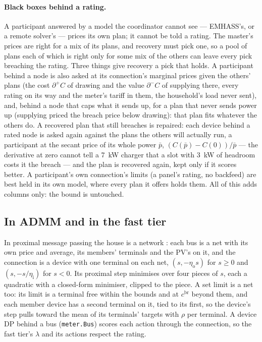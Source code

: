 \documentclass[11pt,a4paper]{article}
\newcommand{\cbr}{c^{\mathrm{br}}}
\begin{document}
\paragraph{Black boxes behind a rating.} A participant answered by a model the
coordinator cannot see --- EMHASS's, or a remote solver's --- prices its own
plan; it cannot be told a rating. The master's prices are right for a mix of
its plans, and recovery must pick one, so a pool of plans each of which is
right only for some mix of the others can leave every pick breaching the
rating. Three things give recovery a pick that holds. A participant behind a
node is also asked at its connection's marginal prices given the others' plans
(the cost $\partial^+ C$ of drawing and the value $\partial^- C$ of supplying
there, every rating on its way and the meter's tariff in them, the household's
load never sent), and, behind a node that caps what it sends up, for a plan
that never sends power up (supplying priced the breach price below drawing):
that plan fits whatever the others do. A recovered plan that still breaches is
repaired: each device behind a rated node is asked again against the plans the
others will actually run, a participant at the secant price of its whole power
$\bar p$, $(C(\bar p) - C(0))/\bar p$ --- the derivative at zero cannot tell a
7~kW charger that a slot with 3~kW of headroom costs it the breach --- and the
plan is recovered again, kept only if it scores better. A participant's own
connection's limits (a panel's rating, no backfeed) are best held in its own
model, where every plan it offers holds them. All of this adds columns only:
the bound is untouched.

\subsection{In ADMM and in the fast tier}

In proximal message passing the house is a network \cite{kraning2014}: each bus is
a net with its own price and average, its members' terminals and the PV's on it,
and the connection is a device with one terminal on each net, $(s, -\eta_{\mathrm o}s)$
for $s \ge 0$ and $(s, -s/\eta_{\mathrm i})$ for $s < 0$. Its proximal step
minimises over four pieces of $s$, each a quadratic with a closed-form minimiser,
clipped to the piece. A set limit is a net too: its limit is a terminal free
within the bounds and at $\cbr$ beyond them, and each member device has a
second terminal on it, tied to its first, so the device's step pulls toward the
mean of its terminals' targets with $\rho$ per terminal. A device DP behind a bus (\texttt{meter.Bus}) scores each
action through the connection, so the fast tier's $\lambda$ and its actions
respect the rating.
\end{document}
